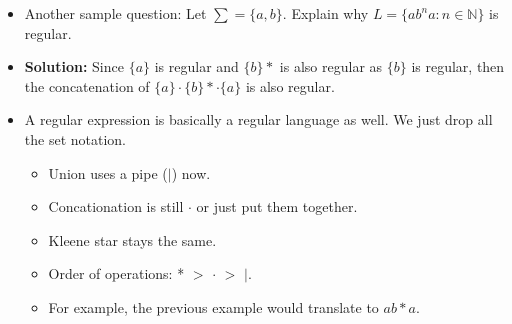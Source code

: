 \documentclass[12pt]{article}
\begin{document}
\begin{itemize}
\begin{itemize}
        \end{itemize}
    \item Another sample question: Let $\sum = \{a, b\}$. Explain why $L = \{ab^na : n \in \mathbb{N}\}$ is regular.
    \item \textbf{Solution:} Since $\{a\}$ is regular and $\{b\}*$ is also regular as $\{b\}$ is regular, then the concatenation of $\{a\} \cdot \{b\}* \cdot \{a\}$ is also regular.
    \item A regular expression is basically a regular language as well.  We just drop all the set notation.
        \begin{itemize}
            \item Union uses a pipe ($|$) now.
            \item Concationation is still $\cdot$ or just put them together.
            \item Kleene star stays the same.
            \item Order of operations: * $>$ $\cdot$ $>$ $|$.  
            \item For example, the previous example would translate to $ab*a$.
        \end{itemize}
\end{itemize}
\end{document}

